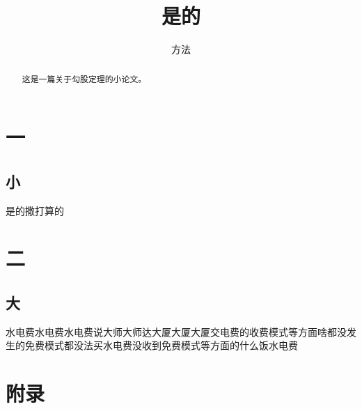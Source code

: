 \documentclass[UTF8][10pt]{ctexart}  %
\begin{document}
  
\title{是的}
\author{方法}
\maketitle
\begin{abstract}         
这是一篇关于勾股定理的小论文。
\end{abstract}
\tableofcontents 
\section{一}  
\subsection{小}
是的撒打算的
\section{二}
\subsection{大}
水电费水电费水电费说大师大师达大厦大厦大厦交电费的收费模式等方面啥都没发生的免费模式都没法买水电费没收到免费模式等方面的什么饭水电费

\section{附录}  
\end{document}
